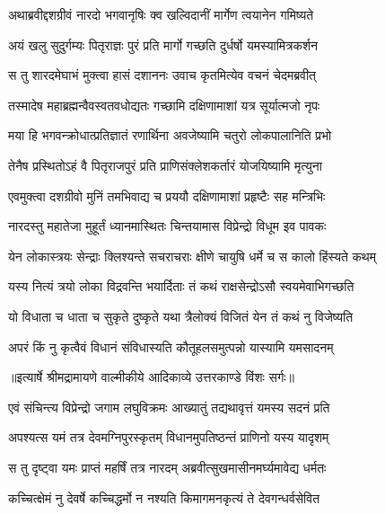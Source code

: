 \twolineshloka
{अथाब्रवीद्दशग्रीवं नारदो भगवानृषिः}
{क्व खल्विदानीं मार्गेण त्वयानेन गमिष्यते} %

\twolineshloka
{अयं खलु सुदुर्गम्यः पितृराज्ञः पुरं प्रति}
{मार्गो गच्छति दुर्धर्षो यमस्यामित्रकर्शन} %

\twolineshloka
{स तु शारदमेघाभं मुक्त्वा हासं दशाननः}
{उवाच कृतमित्येव वचनं चेदमब्रवीत्} %

\twolineshloka
{तस्मादेष महाब्रह्मन्वैवस्वतवधोद्यतः}
{गच्छामि दक्षिणामाशां यत्र सूर्यात्मजो नृपः} %

\twolineshloka
{मया हि भगवन्क्रोधात्प्रतिज्ञातं रणार्थिना}
{अवजेष्यामि चतुरो लोकपालानिति प्रभो} %

\twolineshloka
{तेनैष प्रस्थितोऽहं वै पितृराजपुरं प्रति}
{प्राणिसंक्लेशकर्तारं योजयिष्यामि मृत्युना} %

\twolineshloka
{एवमुक्त्वा दशग्रीवो मुनिं तमभिवाद्य च}
{प्रययौ दक्षिणामाशां प्रहृष्टैः सह मन्त्रिभिः} %

\twolineshloka
{नारदस्तु महातेजा मुहूर्तं ध्यानमास्थितः}
{चिन्तयामास विप्रेन्द्रो विधूम इव पावकः} %

\twolineshloka
{येन लोकास्त्रयः सेन्द्राः क्लिश्यन्ते सचराचराः}
{क्षीणे चायुषि धर्मे च स कालो हिंस्यते कथम्} %

\twolineshloka
{यस्य नित्यं त्रयो लोका विद्रवन्ति भयार्दिताः}
{तं कथं राक्षसेन्द्रोऽसौ स्वयमेवाभिगच्छति} %

\twolineshloka
{यो विधाता च धाता च सुकृते दुष्कृते यथा}
{त्रैलोक्यं विजितं येन तं कथं नु विजेष्यति} %

\twolineshloka
{अपरं किं नु कृत्वैवं विधानं संविधास्यति}
{कौतूहलसमुत्पन्नो यास्यामि यमसादनम्} %


{॥इत्यार्षे श्रीमद्रामायणे वाल्मीकीये आदिकाव्ये उत्तरकाण्डे विंशः सर्गः॥}


\twolineshloka
{एवं संचिन्त्य विप्रेन्द्रो जगाम लघुविक्रमः}
{आख्यातुं तद्यथावृत्तं यमस्य सदनं प्रति} %

\twolineshloka
{अपश्यत्स यमं तत्र देवमग्निपुरस्कृतम्}
{विधानमुपतिष्ठन्तं प्राणिनो यस्य यादृशम्} %

\twolineshloka
{स तु दृष्ट्वा यमः प्राप्तं महर्षिं तत्र नारदम्}
{अब्रवीत्सुखमासीनमर्घ्यमावेद्य धर्मतः} %

\twolineshloka
{कच्चित्क्षेमं नु देवर्षे कच्चिद्धर्मो न नश्यति}
{किमागमनकृत्यं ते देवगन्धर्वसेवित} %


